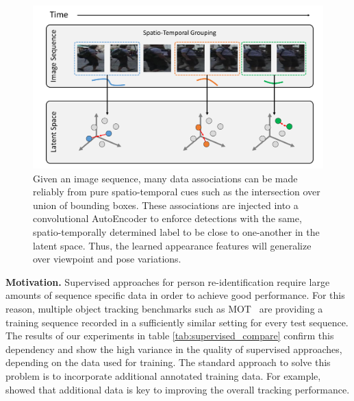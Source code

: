 \begin{figure}[t]
	\begin{center}
		\includegraphics[width=0.7\linewidth]{Fig_1_teaser.pdf}
	\end{center}
	\caption{Given an image sequence, many data associations can be made reliably from pure spatio-temporal cues such as the intersection over union of bounding boxes. These associations are injected into a convolutional AutoEncoder to enforce detections with the same, spatio-temporally determined label to be close to one-another in the latent space. Thus, the learned appearance features will generalize over viewpoint and pose variations.}
	\label{fig:teaser}
\vspace*{-5mm}
\end{figure}
\noindent\textbf{Motivation.}
Supervised approaches for person re-identification require large amounts of sequence specific data in order to achieve good performance. For this reason, multiple object tracking benchmarks such as MOT~\cite{MOT16} are providing a training  sequence recorded in a sufficiently similar setting for every test sequence. The results of our experiments in table \ref{tab:supervised_compare} confirm this dependency and show the high variance in the quality of supervised approaches, depending on the data used for training. The standard approach to solve this problem is to incorporate additional annotated training data. For example, \cite{yoon2018online, feng2019multi} showed that additional data is key to improving the overall tracking performance.



